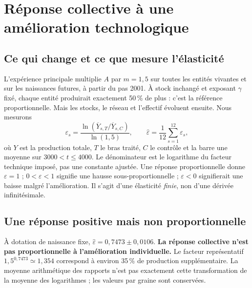 \section{Réponse collective à une amélioration technologique}\label{sec:rebond}
\subsection{Ce qui change et ce que mesure l'élasticité}
L'expérience principale multiplie $A$ par $m=1{,}5$ sur toutes les
entités vivantes et sur les naissances futures, à partir du pas 2001.
À stock inchangé et exposant $\gamma$ fixé, chaque entité produirait
exactement 50\,\% de plus : c'est la référence proportionnelle.
Mais les stocks, le réseau et l'effectif évoluent ensuite. Nous mesurons
\begin{equation}
 \varepsilon_s=\frac{\ln(\overline Y_{s,T}/\overline Y_{s,C})}{\ln(1{,}5)},
 \qquad \widehat\varepsilon=\frac1{12}\sum_{s=1}^{12}\varepsilon_s,
 \label{eq:eps}
\end{equation}
où $Y$ est la production totale, $T$ le bras traité, $C$ le contrôle et
la barre une moyenne sur $3000<t\le4000$. Le dénominateur est le
logarithme du facteur technique imposé, pas une constante ajustée.
Une réponse proportionnelle donne $\varepsilon=1$ ; $0<\varepsilon<1$
signifie une hausse sous-proportionnelle ; $\varepsilon<0$ signifierait
une baisse malgré l'amélioration. Il s'agit d'une élasticité \emph{finie},
non d'une dérivée infinitésimale.

\subsection{Une réponse positive mais non proportionnelle}
À dotation de naissance fixe, $\widehat\varepsilon=0{,}7473\pm0{,}0106$.
\textbf{La réponse collective n'est pas proportionnelle à l'amélioration
individuelle.} Le facteur représentatif $1{,}5^{0{,}7473}\simeq1{,}354$
correspond à environ 35\,\% de production supplémentaire. La moyenne
arithmétique des rapports n'est pas exactement cette transformation de
la moyenne des logarithmes ; les valeurs par graine sont conservées.


